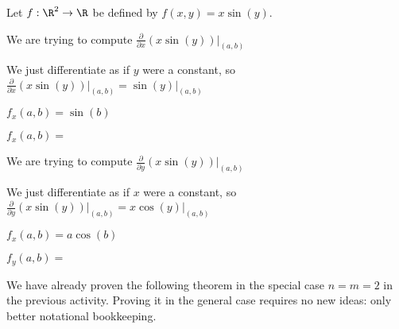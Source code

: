 \documentclass{ximera}
\begin{document}
	\begin{question}
		
	Let $f:\R^2 \to \R$ be defined by $f(x,y) = x\sin(y)$.  
	\begin{solution}
		\begin{hint}
			We are trying to compute $\frac{\partial}{\partial x} \left(x \sin(y)\right)\big|_{(a,b)}$
		\end{hint}
		\begin{hint}
			We just differentiate as if $y$ were a constant, so 
			 $\frac{\partial}{\partial x} \left(x \sin(y)\right)\big|_{(a,b)} = \sin(y)\big|_{(a,b)}$
		\end{hint}
		\begin{hint}
			$f_x(a,b) = \sin(b)$
		\end{hint}
		$f_x(a,b) = $ 
	\end{solution}
	
	\begin{solution}
	\begin{hint}
			We are trying to compute $\frac{\partial}{\partial y} \left(x \sin(y)\right)\big|_{(a,b)}$
		\end{hint}
		\begin{hint}
			We just differentiate as if $x$ were a constant, so 
			 $\frac{\partial}{\partial y} \left(x \sin(y)\right)\big|_{(a,b)} = x\cos(y)\big|_{(a,b)}$
		\end{hint}
		\begin{hint}
			$f_x(a,b) = a\cos(b)$
		\end{hint}
		$f_y(a,b) = $ \answer{$a(cos(b))$}
	\end{solution}
	
	\end{question}
	
	We have already proven the following theorem in the special case $n=m=2$ in the previous activity.  Proving it in the general case requires no new ideas: 
	 only better notational bookkeeping.
	
\end{document}
